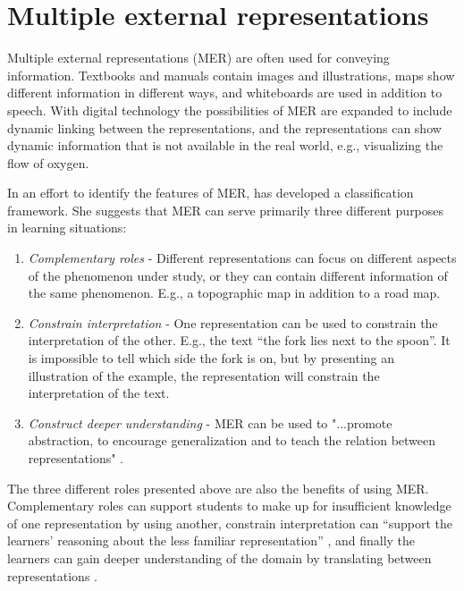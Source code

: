 
\section{Multiple external representations}
Multiple external representations (MER) are often used for conveying information. Textbooks and manuals contain images and illustrations, maps show different information in different ways, and whiteboards are used in addition to speech. With digital technology the possibilities of MER are expanded to include dynamic linking between the representations, and the representations can show dynamic information that is not available in the real world, e.g., visualizing the flow of oxygen. 

In an effort to identify the features of MER, \citet{ainsworth1999functions} has developed a classification framework. She suggests that MER can serve primarily three different purposes in learning situations:
\begin{enumerate}
\item{} \emph{Complementary roles} - Different representations can focus on different aspects of the phenomenon under study, or they can contain different information of the same phenomenon. E.g., a topographic map in addition to a road map. 
\item{} \emph{Constrain interpretation} - One representation can be used to constrain the interpretation of the other. E.g., the text “the fork lies next to the spoon”. It is impossible to tell which side the fork is on, but by presenting an illustration of the example, the representation will constrain the interpretation of the text. 
\item{} \emph{Construct deeper understanding} - MER can be used to "...promote abstraction, to encourage generalization and to teach the relation between representations" \citep[p. 141]{ainsworth1999functions}. 
\end{enumerate}

The three different roles presented above are also the benefits of using MER. Complementary roles can support students to make up for insufficient knowledge of one representation by using another, constrain interpretation can “support the learners’ reasoning about the less familiar representation” \citet{ainsworth1999functions}, and finally the learners can gain deeper understanding of the domain by translating between representations \citep{van2006supporting}. 

